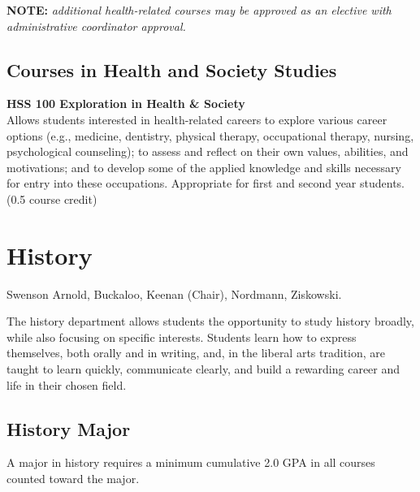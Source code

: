 \documentclass[
  letterpaper,
]{scrbook}
\begin{document}
\textbf{NOTE:} \emph{additional health-related courses may be approved
as an elective with administrative coordinator approval.}

\subsection{Courses in Health and Society
Studies}\label{courses-in-health-and-society-studies}

\textbf{HSS 100 Exploration in Health \& Society}\\
Allows students interested in health-related careers to explore various
career options (e.g., medicine, dentistry, physical therapy,
occupational therapy, nursing, psychological counseling); to assess and
reflect on their own values, abilities, and motivations; and to develop
some of the applied knowledge and skills necessary for entry into these
occupations. Appropriate for first and second year students. (0.5 course
credit)

\section{History}\label{sec-history}

Swenson Arnold, Buckaloo, Keenan (Chair), Nordmann, Ziskowski.

The history department allows students the opportunity to study history
broadly, while also focusing on specific interests. Students learn how
to express themselves, both orally and in writing, and, in the liberal
arts tradition, are taught to learn quickly, communicate clearly, and
build a rewarding career and life in their chosen field.

\subsection{History Major}\label{history-major}

A major in history requires a minimum cumulative 2.0 GPA in all courses
counted toward the major.
\end{document}
